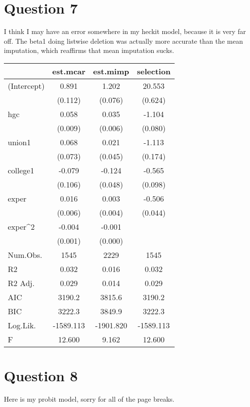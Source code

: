 \documentclass{homework}
\begin{document}
\section{Question 7}
I think I may have an error somewhere in my heckit model, because it is very far off. The beta1 doing listwise deletion was actually more accurate than the mean imputation, which reaffirms that mean imputation sucks. 
\begin{table}[h]
\centering
\begin{tabular}[t]{lccc}
\toprule
  & est.mcar & est.mimp & selection\\
\midrule
(Intercept) & 0.891 & 1.202 & 20.553\\
 & (0.112) & (0.076) & (0.624)\\
hgc & 0.058 & 0.035 & -1.104\\
 & (0.009) & (0.006) & (0.080)\\
union1 & 0.068 & 0.021 & -1.113\\
 & (0.073) & (0.045) & (0.174)\\
college1 & -0.079 & -0.124 & -0.565\\
 & (0.106) & (0.048) & (0.098)\\
exper & 0.016 & 0.003 & -0.506\\
 & (0.006) & (0.004) & (0.044)\\
exper^2 & -0.004 & -0.001\\
 & (0.001) & (0.000) & \\
\midrule
Num.Obs. & 1545 & 2229 & 1545\\
R2 & 0.032 & 0.016 & 0.032\\
R2 Adj. & 0.029 & 0.014 & 0.029\\
AIC & 3190.2 & 3815.6 & 3190.2\\
BIC & 3222.3 & 3849.9 & 3222.3\\
Log.Lik. & -1589.113 & -1901.820 & -1589.113\\
F & 12.600 & 9.162 & 12.600\\
\bottomrule
\end{tabular}
\end{table}

\pagebreak

\section{Question 8}

Here is my probit model, sorry for all of the page breaks.
\end{document}
